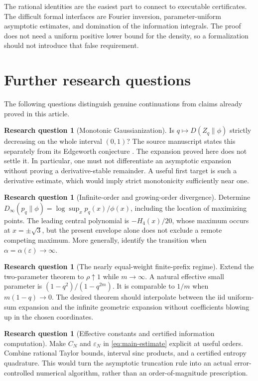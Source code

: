 \documentclass[11pt,a4paper]{article}
\numberwithin{equation}{section}
\theoremstyle{definition}
\newtheorem{problem}[theorem]{Research question}
\theoremstyle{remark}
\newcommand{\eps}{\varepsilon}
\begin{document}
The rational identities are the easiest part to connect to executable
certificates. The difficult formal interfaces are Fourier inversion,
parameter-uniform asymptotic estimates, and domination of the information
integrals. The proof does not need a uniform positive lower bound for the
density, so a formalization should not introduce that false requirement.

\section{Further research questions}
\label{sec:questions}

The following questions distinguish genuine continuations from claims already
proved in this article.

\begin{problem}[Monotonic Gaussianization]
Is $q\mapsto D(Z_q\|\phi)$ strictly decreasing on the whole interval $(0,1)$?
The source manuscript states this separately from its Edgeworth conjecture
\cite{repo}. The expansion proved here does not settle it. In particular,
one must not differentiate an asymptotic expansion without proving a
derivative-stable remainder. A useful first target is such a derivative
estimate, which would imply strict monotonicity sufficiently near one.
\end{problem}

\begin{problem}[Infinite-order and growing-order divergence]
Determine $D_\infty(p_q\|\phi)=\log\sup_x p_q(x)/\phi(x)$, including the
location of maximizing points. The leading central polynomial is
$-H_4(x)/20$, whose maximum occurs at $x=\pm\sqrt3$, but the present
envelope alone does not exclude a remote competing maximum. More generally,
identify the transition when $\alpha=\alpha(\eps)\to\infty$.
\end{problem}

\begin{problem}[The nearly equal-weight finite-prefix regime]
Extend the two-parameter theorem to $\rho\uparrow1$ while $m\to\infty$.
A natural effective small parameter is
$(1-q^2)/(1-q^{2m})$. It is comparable to $1/m$ when $m(1-q)\to0$.
The desired theorem should interpolate between the iid uniform-sum expansion
and the infinite geometric expansion without coefficients blowing up in the
chosen coordinates.
\end{problem}

\begin{problem}[Effective constants and certified information computation]
Make $C_N$ and $\eps_N$ in \eqref{eq:main-estimate} explicit at useful
orders. Combine rational Taylor bounds, interval sinc products, and a
certified entropy quadrature. This would turn the asymptotic truncation rule
into an actual error-controlled numerical algorithm, rather than an
order-of-magnitude prescription.
\end{problem}
\end{document}
